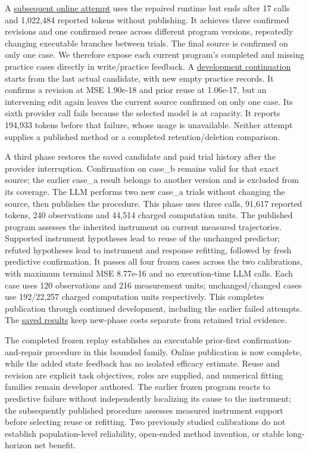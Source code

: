 \documentclass[twoside,11pt]{article}
\begin{document}
A \hyperlink{artifact-64}{subsequent online attempt}
uses the repaired runtime but ends after 17 calls and 1,022,484 reported tokens
without publishing. It achieves three confirmed revisions and one confirmed reuse
across different program versions, repeatedly changing executable branches between
trials. The final source is confirmed on only one case. We therefore expose each
current program's completed and missing practice cases directly in write/practice
feedback. A \hyperlink{artifact-65}{development continuation}
starts from the last actual candidate, with new empty practice records. It confirms
a revision at MSE 1.90e-18 and prior reuse at 1.06e-17, but an intervening edit again
leaves the current source confirmed on only one case. Its sixth provider call fails
because the selected model is at capacity. It reports 194,933 tokens before that
failure, whose usage is unavailable. Neither attempt supplies a published method
or a completed retention/deletion comparison.


A third phase restores the saved candidate and paid trial history after the
provider interruption. Confirmation on case\_b remains valid for that exact source;
the earlier case\_a result belongs to another version and is excluded from its
coverage. The LLM performs two new case\_a trials without changing the source, then
publishes the procedure. This phase uses three calls, 91,617 reported tokens,
240 observations and 44,514 charged computation units. The published program
assesses the inherited instrument on current measured trajectories. Supported
instrument hypotheses lead to reuse of the unchanged predictor; refuted hypotheses
lead to instrument and response refitting, followed by fresh predictive confirmation.
It passes all four frozen cases across the two calibrations, with maximum terminal
MSE 8.77e-16 and no execution-time LLM calls. Each case uses 120 observations and
216 measurement units; unchanged/changed cases use 192/22,257 charged computation
units respectively. This completes publication through continued development,
including the earlier failed attempts. The \hyperlink{artifact-66}{saved results}
keep new-phase costs separate from retained trial evidence.


The completed frozen replay establishes an executable prior-first confirmation-and-repair
procedure in this bounded family. Online publication is now complete, while the
added state feedback has no isolated efficacy estimate. Reuse and revision are
explicit task objectives, roles are supplied, and numerical fitting families remain
developer authored. The earlier frozen program reacts to predictive failure without
independently localizing its cause to the instrument; the subsequently published
procedure assesses measured instrument support before selecting reuse or refitting.
Two previously studied calibrations do not establish population-level reliability,
open-ended method invention, or stable long-horizon net benefit.
\end{document}
